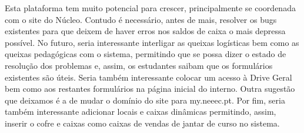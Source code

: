Esta plataforma tem muito potencial para crescer, principalmente se coordenada com o site do Núcleo. Contudo é necessário, antes de mais, resolver os bugs existentes para que deixem de haver erros nos saldos de caixa o mais depressa possível. No futuro, seria interessante interligar as queixas logísticas bem como as queixas pedagógicas com o sistema, permitindo que se possa dizer o estado de resolução dos problemas e, assim, os estudantes saibam que os formulários existentes são úteis. Seria também interessante colocar um acesso à Drive Geral bem como aos restantes formulários na página inicial do interno. Outra sugestão que deixamos é a de mudar o domínio do site para my.neeec.pt. Por fim, seria também interessante adicionar locais e caixas dinâmicas permitindo, assim, inserir o cofre e caixas como caixas de vendas de jantar de curso no sistema.